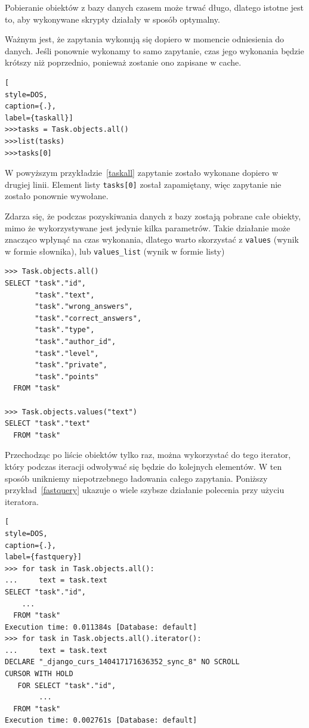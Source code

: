 \documentclass[oneside,polski,logo,indent]{amuthesis}
\begin{document}
Pobieranie obiektów z bazy danych czasem może trwać długo, dlatego istotne jest to, aby wykonywane skrypty działały w sposób optymalny. 

Ważnym jest, że zapytania wykonują się dopiero w momencie odniesienia do danych. Jeśli ponownie wykonamy to samo zapytanie, czas jego wykonania będzie krótszy niż poprzednio, ponieważ zostanie ono zapisane w cache.
\begin{lstlisting}[
style=DOS,
caption={.},
label={taskall}]
>>>tasks = Task.objects.all()
>>>list(tasks)
>>>tasks[0]
\end{lstlisting}
W powyższym przykładzie~\ref{taskall} zapytanie zostało wykonane dopiero w drugiej linii. Element listy \texttt{tasks[0]} został zapamiętany, więc zapytanie nie zostało ponownie wywołane.

Zdarza się, że podczas pozyskiwania danych z bazy zostają pobrane całe obiekty, mimo że wykorzystywane jest jedynie kilka parametrów. Takie działanie może znacząco wpłynąć na czas wykonania, dlatego warto skorzystać z \texttt{values} (wynik w formie słownika), lub \texttt{values\_list} (wynik w formie listy)
\begin{lstlisting}[style=DOS]
>>> Task.objects.all()
SELECT "task"."id",
       "task"."text",
       "task"."wrong_answers",
       "task"."correct_answers",
       "task"."type",
       "task"."author_id",
       "task"."level",
       "task"."private",
       "task"."points"
  FROM "task"

>>> Task.objects.values("text")
SELECT "task"."text"
  FROM "task"
\end{lstlisting}
Przechodząc po liście obiektów tylko raz, można wykorzystać do tego iterator, który podczas iteracji odwoływać się będzie do kolejnych elementów. W ten sposób unikniemy niepotrzebnego ładowania całego zapytania. Poniższy przykład~\ref{fastquery} ukazuje o wiele szybsze działanie polecenia przy użyciu iteratora.
\begin{lstlisting}[
style=DOS,
caption={.},
label={fastquery}]
>>> for task in Task.objects.all():
...     text = task.text
SELECT "task"."id",
	...
  FROM "task"
Execution time: 0.011384s [Database: default]
>>> for task in Task.objects.all().iterator():
...     text = task.text
DECLARE "_django_curs_140417171636352_sync_8" NO SCROLL
CURSOR WITH HOLD
   FOR SELECT "task"."id",
		...
  FROM "task"
Execution time: 0.002761s [Database: default]
\end{lstlisting}
\end{document}
